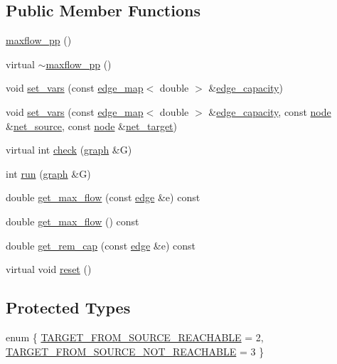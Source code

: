 \subsection*{Public Member Functions}
\begin{DoxyCompactItemize}
\item 
\mbox{\hyperlink{classmaxflow__pp_aec8a04b92a27e8720561ad489a9fb912}{maxflow\+\_\+pp}} ()
\item 
virtual \mbox{\hyperlink{classmaxflow__pp_a2f96bfeea4cb2c044d155d356d72452a}{$\sim$maxflow\+\_\+pp}} ()
\item 
void \mbox{\hyperlink{classmaxflow__pp_ac77f4c613efe7857e053f9bfb103dc3e}{set\+\_\+vars}} (const \mbox{\hyperlink{classedge__map}{edge\+\_\+map}}$<$ double $>$ \&\mbox{\hyperlink{classmaxflow__pp_af3cdc4999a86322271a80b1855d58629}{edge\+\_\+capacity}})
\item 
void \mbox{\hyperlink{classmaxflow__pp_a13756f76387cc114b88a44e324fc93ae}{set\+\_\+vars}} (const \mbox{\hyperlink{classedge__map}{edge\+\_\+map}}$<$ double $>$ \&\mbox{\hyperlink{classmaxflow__pp_af3cdc4999a86322271a80b1855d58629}{edge\+\_\+capacity}}, const \mbox{\hyperlink{classnode}{node}} \&\mbox{\hyperlink{classmaxflow__pp_a20f2d05465acc2d7b777ea8025d12003}{net\+\_\+source}}, const \mbox{\hyperlink{classnode}{node}} \&\mbox{\hyperlink{classmaxflow__pp_a10f0b047011e04cb4816a824da5b7892}{net\+\_\+target}})
\item 
virtual int \mbox{\hyperlink{classmaxflow__pp_a7ea24bd88999718e5e4e28ac028131cd}{check}} (\mbox{\hyperlink{classgraph}{graph}} \&G)
\item 
int \mbox{\hyperlink{classmaxflow__pp_a07c7cb1ae5db23d87cf49ce7769b2814}{run}} (\mbox{\hyperlink{classgraph}{graph}} \&G)
\item 
double \mbox{\hyperlink{classmaxflow__pp_ac561a61619f363ef5d9b8fc5cfb10a5f}{get\+\_\+max\+\_\+flow}} (const \mbox{\hyperlink{classedge}{edge}} \&e) const
\item 
double \mbox{\hyperlink{classmaxflow__pp_a72210f8ac7aeca0a58e7407681003083}{get\+\_\+max\+\_\+flow}} () const
\item 
double \mbox{\hyperlink{classmaxflow__pp_ab3af0c0568ff2c8295166bfd75736169}{get\+\_\+rem\+\_\+cap}} (const \mbox{\hyperlink{classedge}{edge}} \&e) const
\item 
virtual void \mbox{\hyperlink{classmaxflow__pp_a2179764baf624f1414211f3a7181b1a0}{reset}} ()
\end{DoxyCompactItemize}
\subsection*{Protected Types}
\begin{DoxyCompactItemize}
\item 
enum \{ \mbox{\hyperlink{classmaxflow__pp_abd042f1baa6a6200b5bbed755f400d2da54cf9dadeb9ec5994a80e0237d9f2872}{T\+A\+R\+G\+E\+T\+\_\+\+F\+R\+O\+M\+\_\+\+S\+O\+U\+R\+C\+E\+\_\+\+R\+E\+A\+C\+H\+A\+B\+LE}} = 2, 
\mbox{\hyperlink{classmaxflow__pp_abd042f1baa6a6200b5bbed755f400d2dac84c2bfbc74bc6ee5535b2c212502c02}{T\+A\+R\+G\+E\+T\+\_\+\+F\+R\+O\+M\+\_\+\+S\+O\+U\+R\+C\+E\+\_\+\+N\+O\+T\+\_\+\+R\+E\+A\+C\+H\+A\+B\+LE}} = 3
 \}
\end{DoxyCompactItemize}
